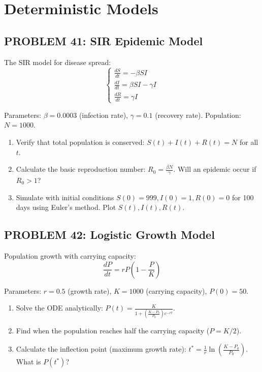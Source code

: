 \documentclass[12pt]{article}
\begin{document}
\newpage
\section*{Deterministic Models}

\subsection*{PROBLEM 41: SIR Epidemic Model}

The SIR model for disease spread:
\[
\begin{cases}
\frac{dS}{dt} = -\beta SI \\
\frac{dI}{dt} = \beta SI - \gamma I \\
\frac{dR}{dt} = \gamma I
\end{cases}
\]

Parameters: \(\beta = 0.0003\) (infection rate), \(\gamma = 0.1\) (recovery rate). Population: \(N = 1000\).

\begin{enumerate}
\item[(a)] Verify that total population is conserved: \(S(t) + I(t) + R(t) = N\) for all \(t\).
\item[(b)] Calculate the basic reproduction number: \(R_0 = \frac{\beta N}{\gamma}\). Will an epidemic occur if \(R_0 > 1\)?
\item[(c)] Simulate with initial conditions \(S(0) = 999, I(0) = 1, R(0) = 0\) for 100 days using Euler's method. Plot \(S(t), I(t), R(t)\).
\end{enumerate}

\subsection*{PROBLEM 42: Logistic Growth Model}

Population growth with carrying capacity:
\[
\frac{dP}{dt} = rP\left(1 - \frac{P}{K}\right)
\]

Parameters: \(r = 0.5\) (growth rate), \(K = 1000\) (carrying capacity), \(P(0) = 50\).

\begin{enumerate}
\item[(a)] Solve the ODE analytically: \(P(t) = \frac{K}{1 + \left(\frac{K-P_0}{P_0}\right)e^{-rt}}\).
\item[(b)] Find when the population reaches half the carrying capacity (\(P = K/2\)).
\item[(c)] Calculate the inflection point (maximum growth rate): \(t^* = \frac{1}{r}\ln\left(\frac{K-P_0}{P_0}\right)\). What is \(P(t^*)\)?
\end{enumerate}
\end{document}
